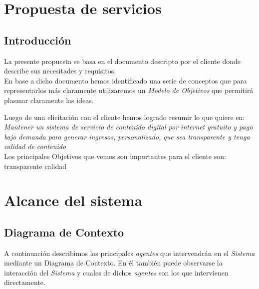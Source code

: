 \documentclass[11pt, a4paper, spanish]{article}
\newenvironment{borde}[1]
{\begin{lrbox}{\fmbox}\begin{minipage}{#1}}
{\end{minipage}\end{lrbox}\fbox{\usebox{\fmbox}}\\[10pt]}
\begin{document}
	



\section{Propuesta de servicios}
\label{sec:Propuesta de servicios}

\subsection{Introducci\'on}

	La presente propuesta se basa en el documento descripto por el cliente donde describe sus necesitades y requisitos.\\

	En base a dicho documento hemos identificado una serie de conceptos que para representarlos m\'as claramente utilizaremos un \emph{Modelo de Objetivos} que permitir\'a plasmar claramente las ideas.

	Luego de una elicitaci\'on con el cliente hemos logrado resumir lo que quiere en: \\

	\emph{Mantener un sistema de servicio de contenido digital por internet 
	gratuito y pago bajo demanda para generar ingresos,  personalizado, 
	que sea transparente y tenga calidad de contenido}
	\\
	Los principales Objetivos que vemos son importantes para el cliente son:\\
	transparente
	calidad

\newpage
	
\section{Alcance del sistema}

\subsection{Diagrama de Contexto}

	A continuaci\'on describimos los principales \emph{agentes} que intervendr\'an en el \emph{Sistema} mediante un Diagrama de Contexto.
	En \'el tambi\'en puede observarse la interacci\'on del \emph{Sistema} y cuales de dichos \emph{agentes} son los que intervienen directamente.
\end{document}
